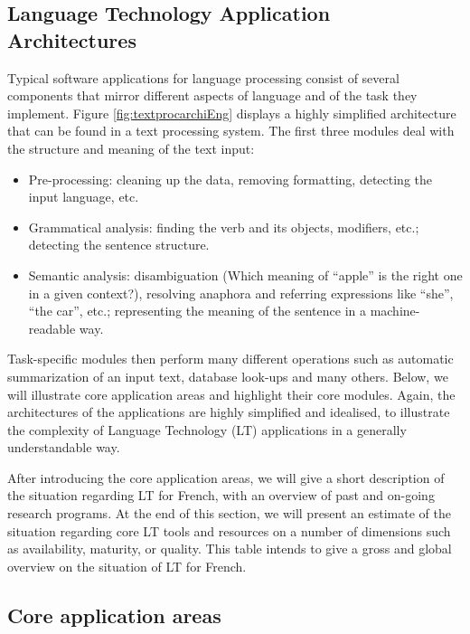 \begin{multicols}{2}
\subsection{Language Technology Application Architectures}

Typical software applications for language processing consist of
several components that mirror different aspects of language and of
the task they implement. Figure \ref{fig:textprocarchiEng} displays a highly
simplified architecture that can be found in a text processing
system. The first three modules deal with the structure and meaning of
the text input:
\begin{itemize}
\item Pre-processing: cleaning up the data, removing formatting,
  detecting the input language, etc.
\item Grammatical analysis: finding the verb and its objects,
  modifiers, etc.; detecting the sentence structure.
\item Semantic analysis: disambiguation (Which meaning of ``apple'' is the
  right one in a given context?), resolving anaphora and referring
  expressions like ``she'', ``the car'', etc.; representing the meaning of the
  sentence in a machine-readable way.
\end{itemize}

Task-specific modules then perform many different operations such as
automatic summarization of an input text, database look-ups and many
others. Below, we will illustrate core application areas and highlight
their core modules. Again, the architectures of the applications are
highly simplified and idealised, to illustrate the complexity of
Language Technology (LT) applications in a generally understandable
way.



After introducing the core application areas, we will give a short
description of the situation regarding LT for French, with an overview
of past and on-going research programs. At the end of this section, we
will present an estimate of the situation regarding core LT tools and
resources on a number of dimensions such as availability, maturity, or
quality. This table intends to give a gross and global overview on the
situation of LT for French.

\subsection{Core application areas}


\end{multicols}
